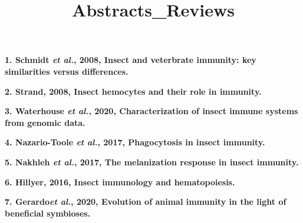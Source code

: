 \documentclass[11pt]{article}
\title{Abstracts_Reviews}
\author{}
\date{}
\begin{document}
\begin{sloppypar}
  \maketitle

  \linenumbers
\textbf{1. Schmidt \textit{et al.}, 2008, Insect and veterbrate immunity: key similarities versus differences.} 
\par
\textbf{2. Strand, 2008, Insect hemocytes and their role in immunity.} 
\par
\textbf{3. Waterhouse \textit{et al.}, 2020, Characterization of insect immune systems from genomic data.}
\par
\textbf{4. Nazario-Toole \textit{et al.}, 2017, Phagocytosis in insect immunity.}
\par
\textbf{5. Nakhleh \textit{et al.}, 2017, The melanization response in insect immunity.}
\par
\textbf{6. Hillyer, 2016, Insect immunology and hematopoiesis.}
\par
\textbf{7. Gerardo\textit{et al.}, 2020, Evolution of animal immunity in the light of beneficial symbioses.}

\par


\end{sloppypar}
\end{document}
